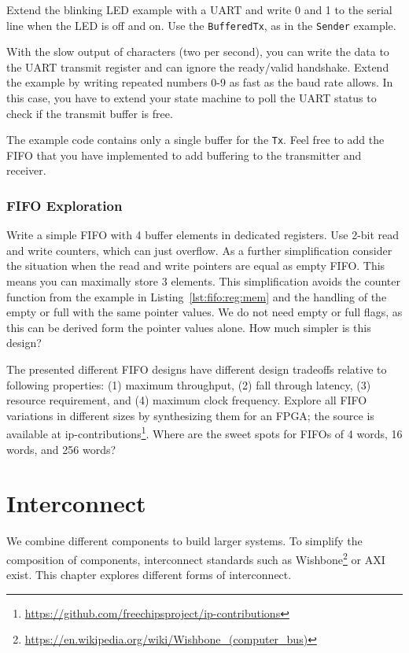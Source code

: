 \documentclass[%
    10pt,
    headinclude, footexclude,
    openright, %
    notitlepage,
    cleardoubleempty,
    headsepline,
    pointlessnumbers,
    bibtotoc, idxtotoc,
    ]{scrbook}
\newcommand{\code}[1]{{\lstinline[basicstyle=\small\ttfamily]{#1}}}
\newcommand{\myref}[2]{\href{#1}{#2}}
\renewcommand{\myref}[2]{{#2}{\footnote{\url{#1}}}}
\begin{document}
Extend the blinking LED example with a UART and write 0 and 1 to the serial
line when the LED is off and on. Use the \code{BufferedTx}, as in the \code{Sender}
example.

With the slow output of characters (two per second), you can write the data
to the UART transmit register and can ignore the ready/valid handshake.
Extend the example by writing repeated numbers 0-9 as fast as the baud rate allows.
In this case, you have to extend your state machine to poll the UART status
to check if the transmit buffer is free.

The example code contains only a single buffer for the \code{Tx}. Feel free to
add the FIFO that you have implemented to add buffering to the transmitter
and receiver.

\subsection{FIFO Exploration}

Write a simple FIFO with 4 buffer elements in dedicated registers.
Use 2-bit read and write counters, which can just overflow.
As a further simplification consider the situation when the read and write
pointers are equal as empty FIFO. This means you can maximally
store 3 elements. This simplification avoids the counter function from
the example in Listing~\ref{lst:fifo:reg:mem} and the handling
of the empty or full with the same pointer values. We do not need
empty or full flags, as this can be derived form the pointer values
alone. How much simpler is this design?

The presented different FIFO designs have different design tradeoffs
relative to following properties: (1) maximum throughput,
(2) fall through latency, (3) resource requirement, and (4)
maximum clock frequency. Explore all FIFO variations in different sizes by
synthesizing them for an FPGA; the source is available at
\myref{https://github.com/freechipsproject/ip-contributions}{ip-contributions}.
Where are the sweet spots for FIFOs of 4 words, 16 words, and 256 words?

\chapter{Interconnect}
\label{chap:interconnect}

We combine different components to build larger systems.
To simplify the composition of components, interconnect standards such as
\myref{https://en.wikipedia.org/wiki/Wishbone_(computer_bus)}{Wishbone}
or AXI exist. This chapter explores different forms of interconnect.
\end{document}
